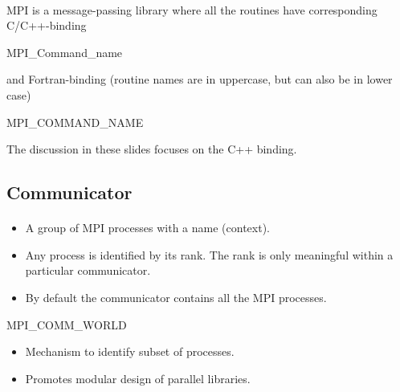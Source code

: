 \documentclass[%
oneside,                 %
final,                   %
10pt]{article}
\begin{document}
\paragraph{}

MPI is a message-passing library where all the routines
have corresponding C/C++-binding


\bcppcod
   MPI_Command_name

\ecppcod

and Fortran-binding (routine names are in uppercase, but can also be in lower case)


\bforcod
   MPI_COMMAND_NAME

\eforcod

The discussion in these slides focuses on the C++ binding.



\subsection{Communicator}

\paragraph{}
\begin{itemize}
\item A group of MPI processes with a name (context).

\item Any process is identified by its rank. The rank is only meaningful within a particular communicator.

\item By default the communicator contains all the MPI processes.
\end{itemize}

\noindent


\bcppcod
  MPI_COMM_WORLD 

\ecppcod

\begin{itemize}
\item Mechanism to identify subset of processes.

\item Promotes modular design of parallel libraries.
\end{itemize}

\noindent
\end{document}
